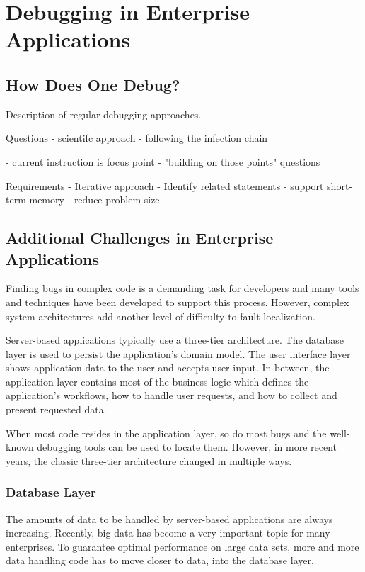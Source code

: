 \chapter{Debugging in Enterprise Applications}

\section{How Does One Debug?}

Description of regular debugging approaches.


Questions
- scientifc approach
- following the infection chain

- current instruction is focus point
- "building on those points" questions 

Requirements
- Iterative approach
- Identify related statements
- support short-term memory
- reduce problem size

\section{Additional Challenges in Enterprise Applications}

Finding bugs in complex code is a demanding task for developers and many tools and techniques have been developed to support this process.
However, complex system architectures add another level of difficulty to fault localization.

Server-based applications typically use a three-tier architecture.
The database layer is used to persist the application's domain model.
The user interface layer shows application data to the user and accepts user input.
In between, the application layer contains most of the business logic which defines the application's workflows, how to handle user requests, and how to collect and present requested data.

When most code resides in the application layer, so do most bugs and the well-known debugging tools can be used to locate them.
However, in more recent years, the classic three-tier architecture changed in multiple ways.

\subsection{Database Layer}

The amounts of data to be handled by server-based applications are always increasing.
Recently, big data has become a very important topic for many enterprises.
To guarantee optimal performance on large data sets, more and more data handling code has to move closer to data, into the database layer.

